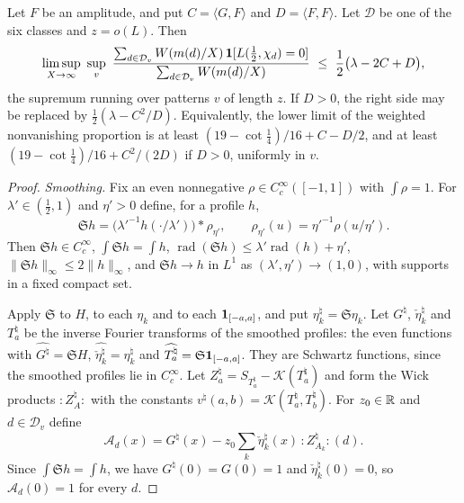 \documentclass[11pt,colorlinks]{charlie}
\newcommand{\rad}{\operatorname{rad}}
\newcommand{\cD}{\mathcal{D}}
\newcommand{\Ka}{\mathcal{K}}
\newcommand{\Wk}[1]{{:}#1{:}}
\begin{document}
\begin{theorem}\label{thm:variational}
Let $F$ be an amplitude, and put $C=\langle G,F\rangle$ and $D=\langle F,F\rangle$. Let $\cD$ be one of the six classes and $z=o(L)$. Then
\[
 \limsup_{X\to\infty}\ \sup_v\ \frac{\sum_{d\in\cD_v}W(m(d)/X)\,\one[L(\frac12,\chi_d)=0]}{\sum_{d\in\cD_v}W(m(d)/X)}\ \le\ \frac12\big(\lambda-2C+D\big),
\]
the supremum running over patterns $v$ of length $z$. If $D>0$, the right side may be replaced by $\frac12(\lambda-C^2/D)$. Equivalently, the lower limit of the weighted nonvanishing proportion is at least $(19-\cot\frac14)/16+C-D/2$, and at least $(19-\cot\frac14)/16+C^2/(2D)$ if $D>0$, uniformly in $v$.
\end{theorem}

\begin{proof}
\emph{Smoothing.} Fix an even nonnegative $\rho\in C_c^\infty([-1,1])$ with $\int\rho=1$. For $\lambda'\in(\frac12,1)$ and $\eta'>0$ define, for a profile $h$,
\[
 \mathfrak S h=\big(\lambda'^{-1}h(\cdot/\lambda')\big)*\rho_{\eta'},\qquad\rho_{\eta'}(u)=\eta'^{-1}\rho(u/\eta').
\]
Then $\mathfrak Sh\in C_c^\infty$, $\int\mathfrak Sh=\int h$, $\rad(\mathfrak Sh)\le\lambda'\rad(h)+\eta'$, $\|\mathfrak Sh\|_\infty\le2\|h\|_\infty$, and $\mathfrak Sh\to h$ in $L^1$ as $(\lambda',\eta')\to(1,0)$, with supports in a fixed compact set.

Apply $\mathfrak S$ to $H$, to each $\eta_k$ and to each $\mathbf{1}_{[-a,a]}$, and put $\eta_k^\natural=\mathfrak S\eta_k$. Let $G^\natural$, $\check\eta_k^\natural$ and $T_a^\natural$ be the inverse Fourier transforms of the smoothed profiles: the even functions with $\widehat{G^\natural}=\mathfrak SH$, $\widehat{\check\eta_k^\natural}=\eta_k^\natural$ and $\widehat{T_a^\natural}=\mathfrak S\mathbf{1}_{[-a,a]}$. They are Schwartz functions, since the smoothed profiles lie in $C_c^\infty$. Let $Z_a^\natural=S_{T_a^\natural}-\Ka(T_a^\natural)$ and form the Wick products $\Wk{Z^\natural_{A}}$ with the constants $v^\natural(a,b)=\Ka(T_a^\natural,T_b^\natural)$. For $z_0\in\mathbb{R}$ and $d\in\cD_v$ define
\[
 \mathcal A_d(x)=G^\natural(x)-z_0\sum_k\check\eta_k^\natural(x)\,\Wk{Z^\natural_{A_k}}(d).
\]
Since $\int\mathfrak Sh=\int h$, we have $G^\natural(0)=G(0)=1$ and $\check\eta_k^\natural(0)=0$, so $\mathcal A_d(0)=1$ for every $d$.


\end{proof}
\end{document}
